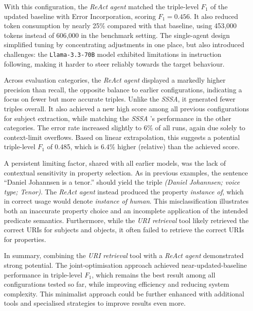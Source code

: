 \documentclass[a4paper,oneside,bibliography=totoc]{scrbook}
\begin{document}
With this configuration, the \textit{\ac{ReAct} agent} matched the triple-level $F_{1}$ of the updated baseline with Error Incorporation, scoring $F_{1}=0.456$. It also reduced token consumption by nearly 25\% compared with that baseline, using 453{,}000 tokens instead of 606{,}000 in the benchmark setting. The single-agent design simplified tuning by concentrating adjustments in one place, but also introduced challenges: the \texttt{Llama-3.3-70B} model exhibited limitations in instruction following, making it harder to steer reliably towards the target behaviour.

Across evaluation categories, the \textit{\ac{ReAct} agent} displayed a markedly higher precision than recall, the opposite balance to earlier configurations, indicating a focus on fewer but more accurate triples. Unlike the \textit{\ac{SSSA}}, it generated fewer triples overall. It also achieved a new high score among all previous configurations for subject extraction, while matching the \textit{\ac{SSSA}} 's performance in the other categories. The error rate increased slightly to 6\% of all runs, again due solely to context-limit overflows. Based on linear extrapolation, this suggests a potential triple-level $F_{1}$ of 0.485, which is 6.4\% higher (relative) than the achieved score.

A persistent limiting factor, shared with all earlier models, was the lack of contextual sensitivity in property selection. As in previous examples, the sentence \enquote{Daniel Johannsen is a tenor.} should yield the triple \textit{(Daniel Johannsen; voice type; Tenor)}. The \textit{\ac{ReAct} agent} instead produced the property \textit{instance of}, which in correct usage would denote \textit{instance of human}. This misclassification illustrates both an inaccurate property choice and an incomplete application of the intended predicate semantics. Furthermore, while the \textit{\ac{URI} retrieval} tool likely retrieved the correct \acp{URI} for subjects and objects, it often failed to retrieve the correct \acp{URI} for properties.

In summary, combining the \textit{\ac{URI} retrieval} tool with a \textit{\ac{ReAct} agent} demonstrated strong potential. The joint-optimisation approach achieved near-updated-baseline performance in triple-level $F_{1}$, which remains the best result among all configurations tested so far, while improving efficiency and reducing system complexity. This minimalist approach could be further enhanced with additional tools and specialised strategies to improve results even more.
\end{document}
